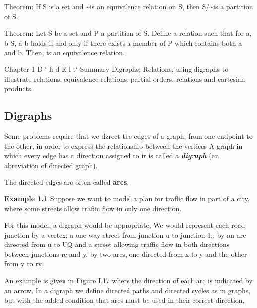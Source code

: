 \documentclass[]{article}
\begin{document}
Theorem: If S is a set and \sim is an equivalence relation on S, then S/\!\sim is a partition of S.

Theorem: Let S be a set and P a partition of S. Define a relation \star such that for a, b \in S, a \star b holds if and only if there exists a member of P which contains both a and b. Then, \star is an equivalence relation.


Chapter 1
D ` h d R l t`
Summary
Digraphs; Relations, using digraphs to illustrate relations, equivalence relations,
partial orders, relations and cartesian products.

\subsection*{Digraphs}
Some problems require that we dzrect the edges of a graph, from one endpoint to
the other, in order to express the relationship between the vertices A graph in
which every edge has a direction assigned to ir is called a \textit{\textbf{digraph}} (an abreviation
of directed graph). 

The directed edges are often called \textbf{arcs}.


\noindent\textbf{Example 1.1} Suppose we want to model a plan for traflic flow in part of a city,
where some streets allow trafiic flow in only one direction. 

For this model, a digraph would be appropriate, We would represent each road junction by a vertex; a one-way street from junction u to junction 1;, by an arc directed from u to UQ and a street allowing traffic flow in both directions between junctions rc and y, by two
arcs, one directed from x to y and the other from y to rv. 

An example is given in
Figure L17 where the direction of each arc is indicated by an arrow.
In a digraph we define directed paths and directed cycles as in graphs, but
with the added condition that arcs must be used in their correct direction, 
\end{document}
